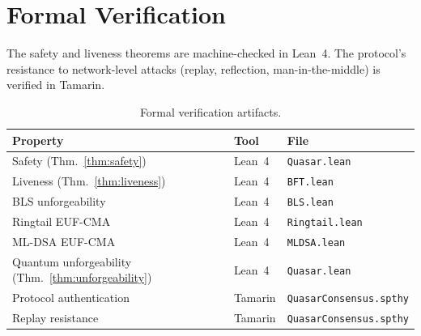 \section{Formal Verification}

\label{sec:formal}

The safety and liveness theorems are machine-checked in Lean~4. The
protocol's resistance to network-level attacks (replay, reflection,
man-in-the-middle) is verified in Tamarin.

\begin{table}[ht]
\centering
\begin{tabular}{@{}lll@{}}
\toprule
\textbf{Property} & \textbf{Tool} & \textbf{File} \\
\midrule
Safety (Thm.~\ref{thm:safety})       & Lean~4  & \texttt{Quasar.lean} \\
Liveness (Thm.~\ref{thm:liveness})   & Lean~4  & \texttt{BFT.lean} \\
BLS unforgeability                     & Lean~4  & \texttt{BLS.lean} \\
Ringtail EUF-CMA                      & Lean~4  & \texttt{Ringtail.lean} \\
ML-DSA EUF-CMA                        & Lean~4  & \texttt{MLDSA.lean} \\
Quantum unforgeability (Thm.~\ref{thm:unforgeability}) & Lean~4 & \texttt{Quasar.lean} \\
Protocol authentication                & Tamarin & \texttt{QuasarConsensus.spthy} \\
Replay resistance                      & Tamarin & \texttt{QuasarConsensus.spthy} \\
\bottomrule
\end{tabular}
\caption{Formal verification artifacts.}
\label{tab:formal}
\end{table}


